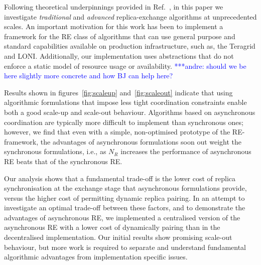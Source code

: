 \documentclass{rspublic}
\newcommand{\alnote}[1]{ {\textcolor{blue} { ***andre: #1 }}}
\newcommand{\athotanote}[1]{ {\textcolor{green} { ***athota: #1 }}}
\newcommand{\alnote}[1]{}
\newcommand{\athotanote}[1]{}
\begin{document}
Following theoretical underpinnings provided in
Ref.~\citep{parashar_arepex,DBLP:journals/jcc/GallicchioLP08}, in this
paper we investigate {\it traditional} and {\it advanced}
replica-exchange algorithms at unprecedented scales.  An important
motivation for this work has been to implement a framework for the RE
class of algorithms that can use general purpose and standard
capabilities available on production infrastructure, such as, the
Teragrid and LONI.  Additionally, our implementation uses abstractions
that do not enforce a static model of resource usage or availability.
\alnote{should we be here slightly more concrete and how BJ can help
here?}

Results shown in figures~\ref{fig:scaleup} and~\ref{fig:scaleout}
indicate that using algorithmic formulations that impose less tight
coordination constraints enable both a good scale-up and scale-out
behaviour.  Algorithms based on asynchronous coordination are
typically more difficult to implement than synchronous ones; however,
we find that even with a simple, non-optimised prototype of the
RE-framework, the advantages of asynchronous formulations soon out
weight the synchronous formulations, i.e., as $N_R$ increases the
performance of asynchronous RE beats that of the synchronous RE.  

Our analysis shows that a fundamental trade-off is the lower cost of
replica synchronisation at the exchange stage that asynchronous
formulations provide, versus the higher cost of permitting dynamic
replica pairing.  In an attempt to investigate an optimal trade-off
between these factors, and to demonstrate the advantages of
asynchronous RE, we implemented a centralised version of the
asynchronous RE with a lower cost of dynamically pairing than in the
decentralised implementation. Our initial results show promising
scale-out behaviour, but more work is required to separate and
understand fundamental algorithmic advantages from implementation
specific issues.




\end{document}

